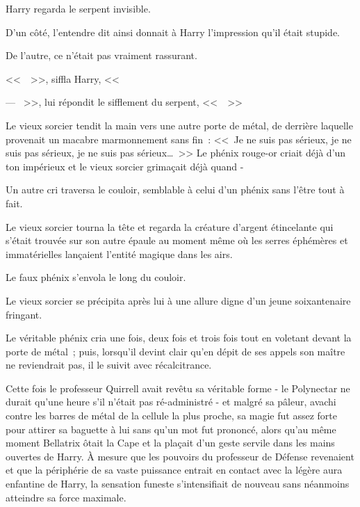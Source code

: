 Harry regarda le serpent invisible.

D'un côté, l'entendre dit ainsi donnait à Harry l'impression qu'il était stupide.

De l'autre, ce n'était pas vraiment rassurant.

<<~~>>, siffla Harry, <<~

--- ~>>, lui répondit le sifflement du serpent, <<~~>>

\later

Le vieux sorcier tendit la main vers une autre porte de métal, de derrière laquelle provenait un macabre marmonnement sans fin~: <<~Je ne suis pas sérieux, je ne suis pas sérieux, je ne suis pas sérieux…~>> Le phénix rouge-or criait déjà d'un ton impérieux et le vieux sorcier grimaçait déjà quand -

Un autre cri traversa le couloir, semblable à celui d'un phénix sans l'être tout à fait.

Le vieux sorcier tourna la tête et regarda la créature d'argent étincelante qui s'était trouvée sur son autre épaule au moment même où les serres éphémères et immatérielles lançaient l'entité magique dans les airs.

Le faux phénix s'envola le long du couloir.

Le vieux sorcier se précipita après lui à une allure digne d'un jeune soixantenaire fringant.

Le véritable phénix cria une fois, deux fois et trois fois tout en voletant devant la porte de métal~; puis, lorsqu'il devint clair qu'en dépit de ses appels son maître ne reviendrait pas, il le suivit avec récalcitrance.

\later

Cette fois le professeur Quirrell avait revêtu sa véritable forme - le Polynectar ne durait qu'une heure s'il n'était pas ré-administré - et malgré sa pâleur, avachi contre les barres de métal de la cellule la plus proche, sa magie fut assez forte pour attirer sa baguette à lui sans qu'un mot fut prononcé, alors qu'au même moment Bellatrix ôtait la Cape et la plaçait d'un geste servile dans les mains ouvertes de Harry. À mesure que les pouvoirs du professeur de Défense revenaient et que la périphérie de sa vaste puissance entrait en contact avec la légère aura enfantine de Harry, la sensation funeste s'intensifiait de nouveau sans néanmoins atteindre sa force maximale.

